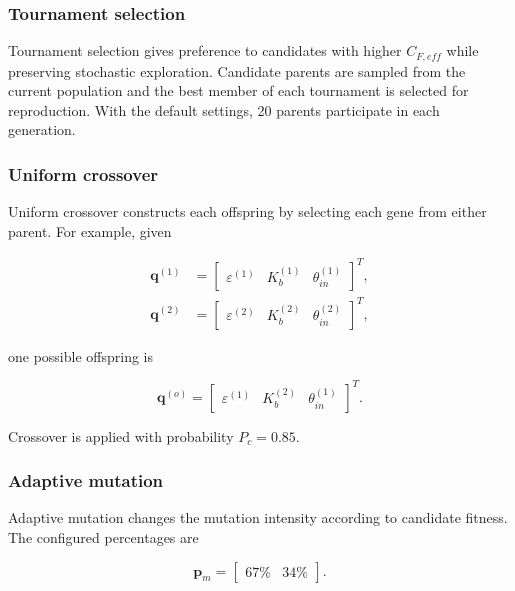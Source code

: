\subsubsection{Tournament selection}

Tournament selection gives preference to candidates with higher
\(C_{F,eff}\) while preserving stochastic exploration. Candidate parents are sampled
from the current population and the best member of each tournament is selected for
reproduction. With the default settings, 20 parents participate in each generation.

\subsubsection{Uniform crossover}

Uniform crossover constructs each offspring by selecting each gene from either
parent. For example, given

\begin{align}
\bm{q}^{(1)}
&=
\begin{bmatrix}
\varepsilon^{(1)} & K_b^{(1)} & \theta_{in}^{(1)}
\end{bmatrix}^{T},\\
\bm{q}^{(2)}
&=
\begin{bmatrix}
\varepsilon^{(2)} & K_b^{(2)} & \theta_{in}^{(2)}
\end{bmatrix}^{T},
\end{align}

one possible offspring is

\begin{equation}
\bm{q}^{(o)}
=
\begin{bmatrix}
\varepsilon^{(1)} & K_b^{(2)} & \theta_{in}^{(1)}
\end{bmatrix}^{T}.
\label{eq:uniform_crossover_example}
\end{equation}

Crossover is applied with probability \(P_c=0.85\).

\subsubsection{Adaptive mutation}

Adaptive mutation changes the mutation intensity according to candidate fitness. The
configured percentages are

\begin{equation}
\bm{p}_m
=
\begin{bmatrix}
67\% & 34\%
\end{bmatrix}.
\label{eq:adaptive_mutation_percentages}
\end{equation}

